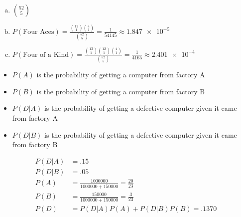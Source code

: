 \documentclass[12pt]{article}
\newenvironment{problem}[2][Problem]{\begin{trivlist}
\item[\hskip \labelsep {\bfseries #1}\hskip \labelsep {\bfseries #2.}]
  \vspace{1 cm}
}{\end{trivlist}}
\begin{document}
\begin{problem}{2.43}
\item
  \begin{enumerate}[a.]
    \item %
      $\binom{52}{5}$
    \item %
      $P(\textrm{Four Aces}) 
      = \frac{\binom{12}{1}\binom{4}{1}}{\binom{52}{5}}
      = \frac{1}{54145} \approx \num{1.847e-5}$
    \item %
      $P(\textrm{Four of a Kind}) 
      = \frac{ \binom{13}{1} \binom{12}{1} \binom{4}{1}}{\binom{52}{5}}
      = \frac{1}{4165} \approx \num{2.401e-4}$
  \end{enumerate}
\end{problem}

\begin{problem}{2.45}
\item
  \begin{itemize}
    \item $P(A)$ is the probability of getting a computer from factory A
    \item $P(B)$ is the probability of getting a computer from factory B
    \item $P(D|A)$ is the probability of getting a defective computer given it came from factory A
    \item $P(D|B)$ is the probability of getting a defective computer given it came from factory B
  \end{itemize}
  \begin{align*}
    P(D|A) &= .15 \\
    P(D|B) &= .05 \\
    P(A) &= \frac{1000000}{1000000 + 150000} = \frac{20}{23} \\
    P(B) &= \frac{150000}{1000000 + 150000} = \frac{3}{23} \\
    P(D) &= P(D|A)P(A) + P(D|B)P(B) = .1370
  \end{align*}
\end{problem}
\end{document}
